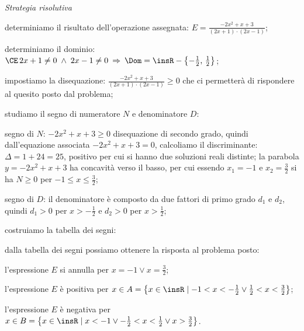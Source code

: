 \begin{exrig}
\begin{esempio}
\emph{Strategia risolutiva}
\begin{enumeratea}
\item determiniamo il risultato dell'operazione assegnata: $E=\frac{-2x^2+x+3}{(2x+1)\cdot (2x-1)}$;
\item determiniamo il dominio: $\CE\, 2x+1\neq 0\;\wedge\; 2x-1\neq 0\:\Rightarrow\: \Dom=\insR-\left\{-\frac 1 2\text{, }\frac 1 2\right\}$;
\item impostiamo la disequazione: $\frac{-2x^2+x+3}{(2x+1)\cdot (2x-1)}\ge 0$ che ci permetterà di rispondere al quesito posto dal problema;
\item studiamo il segno di numeratore $N$ e denominatore $D$:
 \begin{itemize*}
\item segno di $N$: $-2x^2+x+3\ge 0$ disequazione di secondo grado, quindi dall'equazione associata $-2x^2+x+3=0$, calcoliamo il discriminante: $\Delta =1+24=25$, positivo per cui si hanno due soluzioni reali distinte; la parabola $y=-2x^2+x+3$ ha concavità verso il basso, per cui essendo $x_1=-1$ e $x_2=\frac 3 2$ si ha $N\ge 0$ per $-1\le x\le \frac 3 2$;
\item segno di $D$: il denominatore è composto da due fattori di primo grado $d_1$ e $d_2$, quindi $d_1>0$ per $x>-\frac 1 2$ e $d_2>0$ per $x>\frac 1 2$;
 \end{itemize*}
\item costruiamo la tabella dei segni:
\begin{center}
 
\end{center}
\item dalla tabella dei segni possiamo ottenere la risposta al problema posto:
\begin{itemize*}
\item l'espressione $E$ si annulla per $x=-1\vee x=\frac 3 2$;
\item l'espressione $E$ è positiva per $x\in A=\left\{x\in \insR \mid -1<x<-\frac 1 2\vee \frac 1 2<x<\frac 3 2\right\}$;
\item l'espressione $E$ è negativa per $x\in B=\left\{x\in \insR \mid x<-1\vee -\frac 1 2<x<\frac 1 2\vee x>\frac 3 2\right\}$.
\end{itemize*}
\end{enumeratea}
\end{esempio}


\end{exrig}
